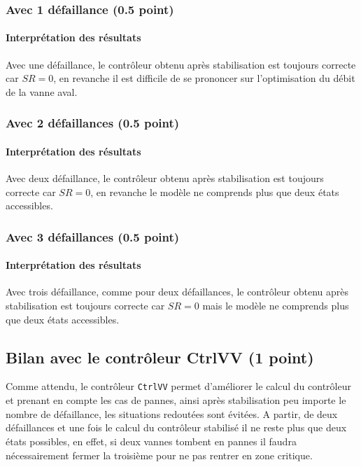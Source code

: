 \documentclass[a4paper]{book}
\begin{document}
\subsubsection{Avec 1 défaillance (0.5 point)}

\paragraph{Interprétation des résultats}

Avec une défaillance, le contrôleur obtenu après stabilisation est toujours
correcte car $SR = 0$, en revanche il est difficile de se prononcer sur
l'optimisation du débit de la vanne aval.

\subsubsection{Avec 2 défaillances (0.5 point)}

\paragraph{Interprétation des résultats}

Avec deux défaillance, le contrôleur obtenu après stabilisation est toujours
correcte car $SR = 0$, en revanche le modèle ne comprends plus que deux états
accessibles.

\subsubsection{Avec 3 défaillances (0.5 point)}

\paragraph{Interprétation des résultats}

Avec trois défaillance, comme pour deux défaillances, le contrôleur obtenu
après stabilisation est toujours correcte car $SR = 0$ mais le modèle ne
comprends plus que deux états accessibles.

\subsection{Bilan avec le contrôleur CtrlVV (1 point)}

Comme attendu, le contrôleur \texttt{CtrlVV} permet d'améliorer le calcul
du contrôleur et prenant en compte les cas de pannes, ainsi après stabilisation
peu importe le nombre de défaillance, les situations redoutées sont évitées. A
partir, de deux défaillances et une fois le calcul du contrôleur stabilisé il
ne reste plus que deux états possibles, en effet, si deux vannes tombent en pannes
il faudra nécessairement fermer la troisième pour ne pas rentrer en zone
critique.
\end{document}

